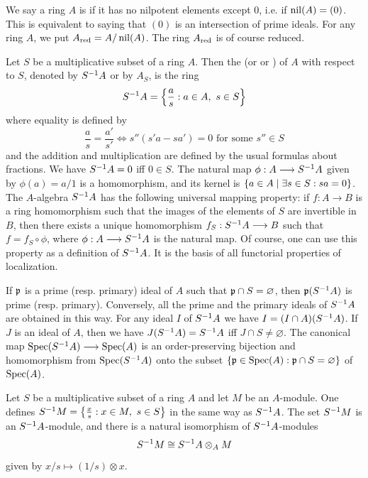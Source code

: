\documentclass[../main]{subfiles}
\begin{document}
We say a ring $A$ is  if it has no nilpotent elements except 0, i.e. if $\operatorname{nil}(A)=(0)$. This is equivalent to saying that $(0)$ is an intersection of prime ideals. For any ring $A$, we put $A_{\text{red}}=A/\operatorname{nil}(A)$. The ring $A_{\text{red}}$ is of course reduced.

\newparagraph
Let $S$ be a multiplicative subset of a ring $A$. Then the  (or  or ) of $A$ with respect to $S$, denoted by $S^{-1} A$ or by $A_S$, is the ring
\[S^{-1} A = \left\{\frac as: a\in A,~s\in S\right\}\]
where equality is defined by
\[\frac as = \frac{a'}{s'}
\iff s''(s'a-sa') = 0 \text{ for some }s''\in S\]
and the addition and multiplication are defined by the usual formulas about fractions. We have $S^{-1} A=0$ iff $0\in S$. The natural map $\phi:A\longrightarrow S^{-1} A$ given by $\phi(a)=a/1$ is a homomorphism, and its kernel is $\left\{a\in A\mid \exists s\in S: sa=0\right\}$. The $A$-algebra $S^{-1} A$ has the following universal mapping property: if $f:A\longrightarrow B$ is a ring homomorphism such that the images of the elements of $S$ are invertible in $B$, then there exists a unique homomorphism $f_S:S^{-1} A\longrightarrow B$ such that $f=f_S\circ\phi$, where $\phi:A\longrightarrow S^{-1} A$ is the natural map. Of course, one can use this property as a definition of $S^{-1} A$. It is the basis of all functorial properties of localization.

If $\mathfrak{p}$ is a prime (resp. primary) ideal of $A$ such that $\mathfrak{p}\cap S=\varnothing$, then $\mathfrak{p}(S^{-1} A)$ is prime (resp. primary). Conversely, all the prime and the primary ideals of $S^{-1} A$ are obtained in this way. For any ideal $I$ of $S^{-1} A$ we have $I=(I\cap A)(S^{-1} A)$. If $J$ is an ideal of $A$, then we have $J(S^{-1} A)=S^{-1} A$ iff $J\cap S\ne\varnothing$. The canonical map $\operatorname{Spec}(S^{-1} A)\longrightarrow\operatorname{Spec}(A)$ is an order-preserving bijection and homomorphism from $\operatorname{Spec}(S^{-1} A)$ onto the subset $\left\{\mathfrak{p}\in\operatorname{Spec}(A): \mathfrak{p}\cap S=\varnothing\right\}$ of $\operatorname{Spec}(A)$.

\newparagraph
Let $S$ be a multiplicative subset of a ring $A$ and let $M$ be an $A$-module. One defines $S^{-1} M=\left\{\frac xs:x\in M,~s\in S\right\}$ in the same way as $S^{-1} A$. The set $S^{-1} M$ is an $S^{-1} A$-module, and there is a natural isomorphism of $S^{-1} A$-modules
\[S^{-1} M \cong S^{-1} A \otimes_A M\]
given by $x/s\mapsto(1/s)\otimes x$.
\end{document}
